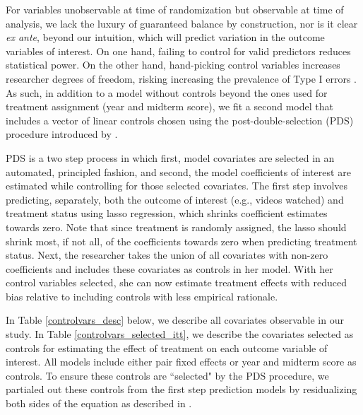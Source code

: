 \documentclass[12pt]{article}
\begin{document}
For variables unobservable at time of randomization but observable at time of analysis, we lack the luxury of guaranteed balance by construction, nor is it clear \textit{ex ante}, beyond our intuition, which will predict variation in the outcome variables of interest. On one hand, failing to control for valid predictors reduces statistical power. On the other hand, hand-picking control variables increases researcher degrees of freedom, risking increasing the prevalence of Type I errors \parencite{sns2011}. As such, in addition to a model without controls beyond the ones used for treatment assignment (year and midterm score), we fit a second model that includes a vector of linear controls chosen using the post-double-selection (PDS) procedure introduced by \textcite{bch2014a}.

PDS is a two step process in which first, model covariates are selected in an automated, principled fashion, and second, the model coefficients of interest are estimated while controlling for those selected covariates. The first step involves predicting, separately, both the outcome of interest (e.g., videos watched) and treatment status using lasso regression, which shrinks coefficient estimates towards zero. Note that since treatment is randomly assigned, the lasso should shrink most, if not all, of the coefficients towards zero when predicting treatment status. Next, the researcher takes the union of all covariates with non-zero coefficients and includes these covariates as controls in her model. With her control variables selected, she can now estimate treatment effects with reduced bias relative to including controls with less empirical rationale.

In Table \ref{controlvars_desc} below, we describe all covariates observable in our study. In Table \ref{controlvars_selected_itt}, we describe the covariates selected as controls for estimating the effect of treatment on each outcome variable of interest. All models include either pair fixed effects or year and midterm score as controls. To ensure these controls are ``selected" by the PDS procedure, we partialed out these controls from the first step prediction models by residualizing both sides of the equation as described in \textcite{bch2014b}.

\clearpage



\clearpage



\clearpage



\clearpage



%
\end{document}
